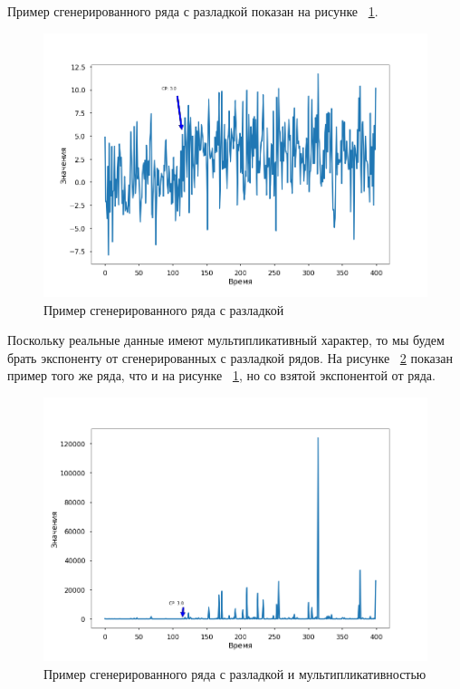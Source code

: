 \documentclass[%
12pt,
master,  %
natbib,      %
subf,        %
substylefile = spbu.rtx,
href,        %
colorlinks,  %
]{disser}
\begin{document}
Пример сгенерированного ряда с разладкой показан на рисунке ~\ref{fig:data_modeling_example_2}.

\begin{figure}[!hhh]
	\begin{center}
		\includegraphics[width=12cm]{data_modeling_example_2}
	\end{center}
	\vspace{-5mm}\caption{Пример сгенерированного ряда с разладкой}
	\label{fig:data_modeling_example_2}
\end{figure}

Поскольку реальные данные имеют мультипликативный характер, то мы будем брать экспоненту от сгенерированных с разладкой рядов. На рисунке ~\ref{fig:data_modeling_example_3} показан пример того же ряда, что и на рисунке ~\ref{fig:data_modeling_example_2}, но со взятой экспонентой от ряда.

\begin{figure}[!hhh]
	\begin{center}
		\includegraphics[width=12cm]{data_modeling_example_3}
	\end{center}
	\vspace{-5mm}\caption{Пример сгенерированного ряда с разладкой и мультипликативностью}
	\label{fig:data_modeling_example_3}
\end{figure}
\end{document}
